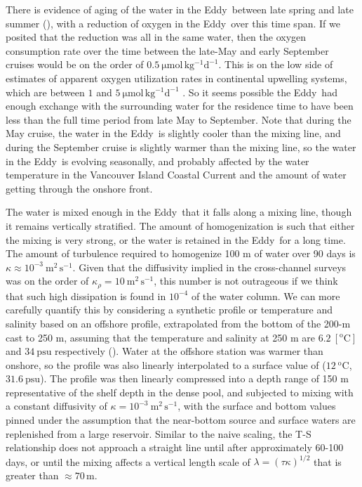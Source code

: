 \documentclass[draft]{agujournal2019}
\newcommand*{\Eddy}{{\sc Eddy}}
\begin{document}
There is evidence of aging of the water in the \Eddy\ between late spring and late summer (), with a reduction of oxygen in the \Eddy\ over this time span.  If we posited that the reduction was all in the same water, then the oxygen consumption rate over the time between the late-May and early September cruises would be on the order of $0.5\ \mathrm{\mu mol\, kg^{-1} d^{-1}}$.  This is on the low side of estimates of apparent oxygen utilization rates in continental upwelling systems, which are between $1$ and $5\  \mathrm{\mu mol\, kg^{-1} d^{-1}}$ \cite{dortchetal94}.   So it seems possible the \Eddy\ had enough exchange with the surrounding water for the residence time to have been less than the full time period from late May to September.  Note that during the May cruise, the water in the \Eddy\ is slightly cooler than the mixing line, and during the September cruise is slightly warmer than the mixing line, so the water in the \Eddy\ is evolving seasonally, and probably affected by the water temperature in the Vancouver Island Coastal Current and the amount of water getting through the onshore front.

The water is  mixed enough in the \Eddy\ that it falls along a mixing line, though it remains vertically stratified. The amount of homogenization is such that either the mixing is very strong, or the water is retained in the \Eddy\ for a long time.  The amount of turbulence required to homogenize 100 m of water over 90 days is $\kappa \approx 10^{-3}\ \mathrm{m^2\,s^{-1}}$.  Given that the diffusivity implied in the cross-channel surveys was on the order of $\kappa_{\rho} = 10 \ \mathrm{m^2\,s^{-1}}$, this number is not outrageous if we think that such high dissipation is found in $10^{-4}$ of the water column. We can more carefully quantify this by considering a synthetic profile or temperature and salinity based on an offshore profile, extrapolated from the bottom of the 200-m cast to 250 m, assuming that the temperature and salinity at 250 m are $6.2\ \mathrm{[^oC]}$ and $34\ \mathrm{psu}$ respectively ().  Water at the offshore station was warmer than onshore, so the profile was also linearly interpolated to a surface value of ($12\ \mathrm{^oC}$, $31.6\ \mathrm{psu}$).  The profile was then linearly compressed into a depth range of 150 m representative of the shelf depth in the dense pool, and subjected to mixing with a constant diffusivity of $\kappa = 10^{-3}\ \mathrm{m^2\,s^{-1}}$, with the surface and bottom values pinned under the assumption that the near-bottom source and surface waters are replenished from a large reservoir.  Similar to the naive scaling, the T-S relationship does not approach a straight line until after approximately 60-100 days, or until the mixing affects a vertical length scale of $\lambda = \left(\tau \kappa\right)^{1/2}$ that is greater than $\approx 70\,\mathrm{m}$.
\end{document}
